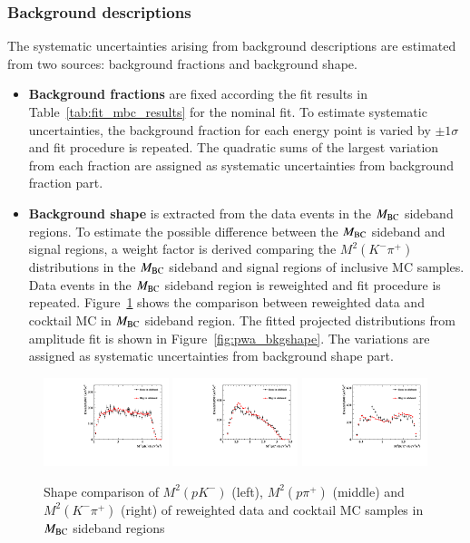 \subsubsection{Background descriptions}
The systematic uncertainties arising from background descriptions are estimated from two sources: background fractions and background shape. 
\begin{itemize}
    \item \textbf{Background fractions} are fixed according the fit results in Table~\ref{tab:fit_mbc_results} for the nominal fit. To estimate systematic uncertainties, the background fraction for each energy point is varied by $\pm 1\sigma$ and fit procedure is repeated. The quadratic sums of the largest variation from each fraction are assigned as systematic uncertainties from background fraction part.
    \item \textbf{Background shape} is extracted from the data events in the $M_{\rm{BC}}$ sideband regions. To estimate the possible difference between the $M_{\rm{BC}}$ sideband and signal regions, a weight factor is derived comparing the $M^2(K^-\pi^+)$ distributions in the $M_{\rm{BC}}$ sideband and signal regions of inclusive MC samples. Data events in the $M_{\rm{BC}}$ sideband region is reweighted and fit procedure is repeated. Figure~\ref{fig:comp_bkg_weight} shows the comparison between reweighted data and cocktail MC in $M_{\rm{BC}}$ sideband region. The fitted projected distributions from amplitude fit is shown in Figure~\ref{fig:pwa_bkgshape}.
    The variations are assigned as systematic uncertainties from background shape part.
\end{itemize}
\begin{figure}[H]\centering
    \includegraphics[width=0.325\textwidth]{figure/sideband/weighted/output_data_mc_0_sideband_m2_12_2c_1.pdf}
    \includegraphics[width=0.325\textwidth]{figure/sideband/weighted/output_data_mc_0_sideband_m2_13_2c_1.pdf}
    \includegraphics[width=0.325\textwidth]{figure/sideband/weighted/output_data_mc_0_sideband_m2_23_2c_1.pdf}
    \caption{Shape comparison of $M^2(pK^-)$ (left), $M^2(p\pi^+)$ (middle) and $M^2(K^-\pi^+)$ (right) of reweighted data and cocktail MC samples in $M_{\rm{BC}}$ sideband regions}
\label{fig:comp_bkg_weight}
\end{figure}

